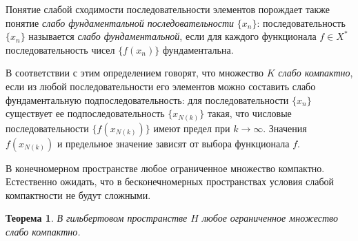 \documentclass[12pt,a4paper,titlepage,oneside]{book}
\theoremstyle{definition}
\theoremstyle{plain}
\newtheorem*{theorem}{Теорема}
\theoremstyle{break}
\theoremstyle{remark}
\theoremstyle{remark}
\theoremstyle{remark}
\theoremstyle{remark}
\theoremstyle{plain}
\theoremstyle{plain}
\begin{document}
Понятие слабой сходимости последовательности элементов порождает также понятие \textit{слабо фундаментальной последовательности} $\{x_n\}$: последовательность $\{x_n\}$ называется \textit{слабо фундаментальной}, если для каждого функционала $f \in X^*$ последовательность чисел $\{f(x_n)\}$ фундаментальна.

В соответствии с этим определением говорят, что множество $K$ \textit{слабо компактно}, если из любой последовательности его элементов можно составить слабо фундаментальную подпоследовательность: для последовательности $\{x_n\}$ существует ее подпоследовательность $\{x_{N(k)}\}$ такая, что числовые последовательности $\{f(x_{N(k)})\}$ имеют предел при $k \to \infty$. Значения $f(x_{N(k)})$ и предельное значение зависят от выбора функционала $f$.

В конечномерном пространстве любое ограниченное множество компактно. Естественно ожидать, что в бесконечномерных пространствах условия слабой компактности не будут сложными.

\begin{theorem}
В гильбертовом пространстве $H$ любое ограниченное множество слабо компактно.
\end{theorem}
\end{document}
